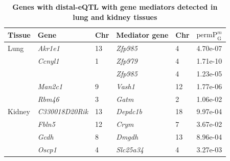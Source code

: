 \documentclass[9pt,twocolumn,twoside]{gsajnl}
\newcommand{\permpmed}{\text{permP}^{m}}
\begin{document}
\begin{table}[h]
\renewcommand{\familydefault}{\sfdefault}\normalfont
\begin{tableminipage}{\textwidth}
\captionsetup{width=\textwidth}
\centering
\caption{\bf Genes with distal-eQTL with gene mediators detected in lung and kidney tissues
\label{tab:exmediation}}
\end{tableminipage}
\begin{tableminipage}{\textwidth}
\begin{tabularx}{\textwidth}{lll|XXX}
\hline 
Tissue & Gene & Chr & Mediator gene & Chr & $\permpmed_{\text{G}}$ \\
\hline
Lung & \textit{Akr1e1} & 13 & \textit{Zfp985} & 4 & 4.70e-07 \\
& \textit{Ccnyl1} & 1 & \textit{Zfp979} & 4 & 1.71e-10 \\
& & & \textit{Zfp985} & 4 & 1.23e-05 \\ 
& \textit{Man2c1} & 9 & \textit{Vash1} & 12 & 1.77e-06 \\
& \textit{Rbm46} & 3 & \textit{Gatm} & 2 & 1.06e-02 \\
\hline
Kidney & \textit{C330018D20Rik} & 13 & \textit{Depdc1b} & 18 & 9.97e-04 \\
& \textit{Fbln5} & 12 & \textit{Crym} & 7 & 3.67e-02 \\
& \textit{Gcdh} & 8 & \textit{Dmgdh} & 13 & 8.96e-04 \\
& \textit{Oscp1} & 4 & \textit{Slc25a34} & 4 & 3.27e-03 \\
\hline
\end{tabularx}
\end{tableminipage}
\end{table}

\clearpage
\end{document}
